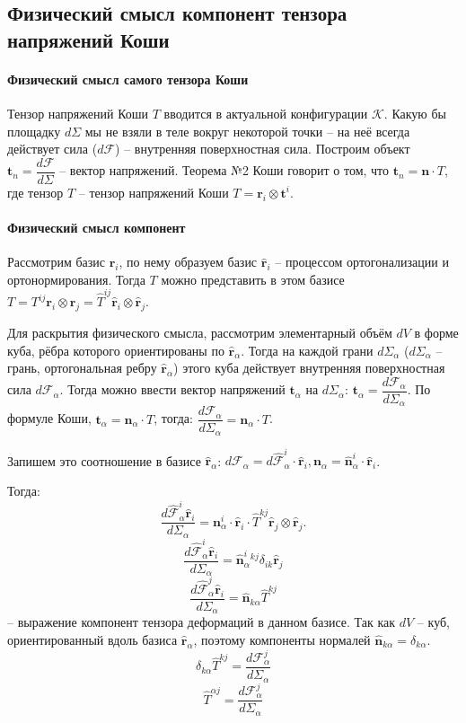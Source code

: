 \subsection{Физический смысл компонент тензора напряжений Коши}

\paragraph{Физический смысл самого тензора Коши}
Тензор напряжений Коши $T$ вводится в актуальной конфигурации $\mathcal{K}$.
Какую бы площадку $d\Sigma$ мы не взяли в теле вокруг некоторой точки
-- на неё всегда действует сила ($d\mathcal{F}$) -- внутренняя поверхностная сила. 
Построим объект $\mathbf{t}_n = \dfrac{d\mathcal{F}}{d\Sigma}$ -- вектор напряжений.
Теорема №2 Коши говорит о том, что $\mathbf{t}_n = \mathbf{n}\cdot T$,
где тензор $T$ -- тензор напряжений Коши $T = \mathbf{r}_i \otimes \mathbf{t}^i$.

\paragraph{Физический смысл компонент}
Рассмотрим базис $\mathbf{r}_i$, по нему образуем базис $\hat{\mathbf{r}}_i$ --
процессом ортогонализации и ортонормирования. Тогда $T$ можно представить в этом
базисе $T = T^{ij} \mathbf{r}_i \otimes \mathbf{r}_j
= \hat{T}^{ij} \hat{\mathbf{r}}_i \otimes \hat{\mathbf{r}}_j$.

Для раскрытия физического смысла, рассмотрим элементарный объём $dV$ в форме куба,
рёбра которого ориентированы по $\hat{\mathbf{r}}_\alpha$. Тогда на каждой
грани $d\Sigma_\alpha$ ($d\Sigma_\alpha$ -- грань, ортогональная ребру $\hat{\mathbf{r}}_\alpha$)
этого куба действует внутренняя поверхностная сила $d\mathbf{\mathcal{F}}_\alpha$.
Тогда можно ввести вектор напряжений $\mathbf{t}_\alpha$ на $d\Sigma_\alpha$:
$\mathbf{t}_\alpha = \dfrac{d\mathbf{\mathcal{F}}_\alpha}{d\Sigma_\alpha}$.
По формуле Коши, $\mathbf{t}_\alpha = \mathbf{n}_\alpha \cdot T$, тогда:
$\dfrac{d\mathbf{\mathcal{F}}_\alpha}{d\Sigma_\alpha} = \mathbf{n}_\alpha \cdot T$.

Запишем это соотношение в базисе $\hat{\mathbf{r}}_\alpha$:
$d\mathbf{\mathcal{F}}_\alpha = d\hat{\mathbf{\mathcal{F}}}^i_\alpha \cdot\hat{\mathbf{r}}_i, \mathbf{n}_\alpha = \hat{\mathbf{n}}^i_\alpha \cdot \hat{\mathbf{r}}_i$.

Тогда:
\[
  \dfrac{d\hat{\mathbf{\mathcal{F}}}^i_\alpha \hat{\mathbf{r}}_i }{d\Sigma_\alpha}
= \mathbf{n}^i_\alpha \cdot \hat{\mathbf{r}}_i \cdot \hat{T}^{kj} \hat{\mathbf{r}}_j \otimes \hat{\mathbf{r}}_j.
\]
\[
  \dfrac{d\hat{\mathbf{\mathcal{F}}}^i_\alpha \hat{\mathbf{r}}_i }{d\Sigma_\alpha}
  = \hat{\mathbf{n}}^i_\alpha ^{kj} \delta_{ik} \hat{\mathbf{r}}_j
\]
\[
  \dfrac{d\hat{\mathbf{\mathcal{F}}}^j_\alpha \hat{\mathbf{r}}_i }{d\Sigma_\alpha}
  = \hat{\mathbf{n}}_{k\alpha} \hat{T}^{kj}
\]
-- выражение компонент тензора деформаций в данном базисе.
Так как $dV$ -- куб, ориентированный вдоль базиса $\hat{\mathbf{r}}_\alpha$,
поэтому компоненты нормалей $\hat{\mathbf{n}}_{k\alpha} = \delta_{k\alpha}$.
\[
  \delta_{k\alpha} \hat{T}^{kj} = \dfrac{d\mathbf{\mathcal{F}}^j_\alpha}{d\Sigma_\alpha}
\]
\[
  \hat{T}^{\alpha j} = \dfrac{d\mathbf{\mathcal{F}}^j_\alpha}{d\Sigma_\alpha}
\]

